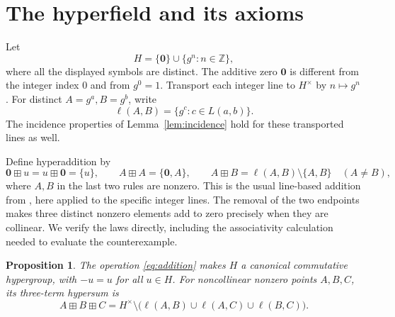 \documentclass[11pt]{article}
\newtheorem{proposition}[theorem]{Proposition}
\theoremstyle{remark}
\newcommand{\Z}{\mathbb Z}
\newcommand{\hz}{\mathbf 0}
\newcommand{\hs}{\boxplus}
\begin{document}
\section{The hyperfield and its axioms}\label{sec:hyperfield}

Let
\[
 H=\{\hz\}\cup\{g^n:n\in\Z\},
\]
where all the displayed symbols are distinct. The additive zero $\hz$
is different from the integer index $0$ and from $g^0=1$.
Transport each integer line to $H^\times$ by $n\mapsto g^n$.
For distinct $A=g^a,B=g^b$, write
\[
 \ell(A,B)=\{g^c:c\in L(a,b)\}.
\]
The incidence properties of Lemma~\ref{lem:incidence} hold for these
transported lines as well.

Define hyperaddition by
\begin{equation}\label{eq:addition}
 \hz\hs u=u\hs\hz=\{u\},\qquad
 A\hs A=\{\hz,A\},\qquad
 A\hs B=\ell(A,B)\setminus\{A,B\}\quad(A\ne B),
\end{equation}
where $A,B$ in the last two rules are nonzero. This is the usual
line-based addition from \cite[Proposition~3.1]{CC}, here applied to the
specific integer lines. The removal of the two endpoints makes three
distinct nonzero elements add to zero precisely when they are collinear.
We verify the laws directly, including the associativity calculation
needed to evaluate the counterexample.

\begin{proposition}\label{prop:hypergroup}
The operation \eqref{eq:addition} makes $H$ a canonical commutative
hypergroup, with $-u=u$ for all $u\in H$. For noncollinear nonzero points
$A,B,C$, its three-term hypersum is
\begin{equation}\label{eq:triangle}
 A\hs B\hs C
 =H^\times\setminus\bigl(\ell(A,B)\cup\ell(A,C)\cup\ell(B,C)\bigr).
\end{equation}
\end{proposition}
\end{document}
